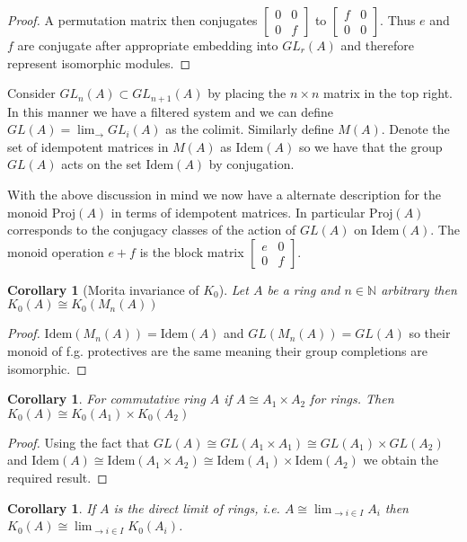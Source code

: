 \documentclass[12pt]{article}
\numberwithin{equation}{section}
\newcommand{\N}{\mathbb{N}}
\newcounter{dummy} \numberwithin{dummy}{section}
\newtheorem{corollary}[dummy]{Corollary}
\begin{document}
\begin{proof}
		A permutation matrix then conjugates $\begin{bmatrix} 0 & 0 \\ 0 & f \end{bmatrix}$ to $\begin{bmatrix} f & 0 \\ 0 & 0 \end{bmatrix}$. Thus $e$ and $f$ are conjugate after appropriate embedding into $GL_r(A)$ and therefore represent isomorphic modules.
	\end{proof}
	
	Consider $GL_n(A) \subset GL_{n+1}(A)$ by placing the $n\times n $ matrix in the top right. In this manner we have a filtered system and we can define $GL(A)= \lim_{\to} GL_i(A)$ as the colimit. Similarly define $M(A)$. Denote the set of idempotent matrices in $M(A)$ as $\mathrm{Idem}(A)$ so we have that the group $GL(A)$ acts on the set $\mathrm{Idem}(A)$ by conjugation.
	
	With the above discussion in mind we now have a alternate description for the monoid $\mathrm{Proj}(A)$ in terms of idempotent matrices. In particular $\mathrm{Proj}(A)$ corresponds to the conjugacy classes of the action of $GL(A)$ on $\mathrm{Idem}(A)$. The monoid operation $e +f$ is the block matrix $\begin{bmatrix}
		e & 0 \\ 0 & f
	\end{bmatrix}. $
	
	\begin{corollary}[Morita invariance of $K_0$]\label{morita}
		Let $A$ be a ring and $n \in \N $ arbitrary then $K_0(A) \cong K_0(M_n(A))$
	\end{corollary}
	\begin{proof}
		$\mathrm{Idem}(M_n(A)) = \mathrm{Idem}(A)$ and $GL(M_n(A)) = GL(A)$ so their monoid of f.g. protectives are the same meaning their group completions are isomorphic.
	\end{proof}
	
	\begin{corollary}\label{propdirectproductofk0}
		For commutative ring $A$ if $A \cong A_1 \times A_2$ for rings. Then	$K_0(A) \cong K_0(A_1) \times K_0(A_2)$
	\end{corollary}
	\begin{proof}
	Using the fact that $GL(A) \cong GL(A_1 \times A_1) \cong GL(A_1) \times GL(A_2)$ and $\mathrm{Idem}(A) \cong \mathrm{Idem}(A_1 \times A_2) \cong \mathrm{Idem}(A_1) \times \mathrm{Idem}(A_2)$ we obtain the required result.
	\end{proof}
	\begin{corollary}\label{directsystem}
		If $A$ is the direct limit of rings, i.e. $A\cong \lim_{\to i \in I} A_i $ then $K_0(A) \cong \lim_{\to i \in I} K_0(A_i)$.
	\end{corollary}
	
\end{document}
